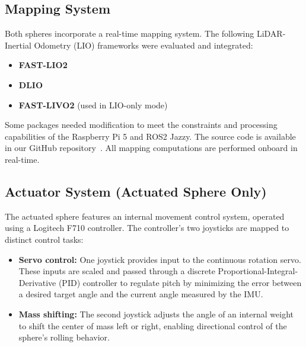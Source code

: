 \documentclass[conference]{IEEEtran}
\begin{document}
\subsection{Mapping System}

Both spheres incorporate a real-time mapping system. 
The following LiDAR-Inertial Odometry (LIO) frameworks were evaluated and integrated:

\begin{itemize}
    \item \textbf{FAST-LIO2}
    \item \textbf{DLIO}
    \item \textbf{FAST-LIVO2} (used in LIO-only mode)
\end{itemize}

Some packages needed modification to meet the constraints and processing capabilities of the Raspberry Pi 5 and ROS2 Jazzy.
The source code is available in our GitHub repository~\cite{githubsphere}.
All mapping computations are performed onboard in real-time.

\subsection{Actuator System (Actuated Sphere Only)}

The actuated sphere features an internal movement control system, operated using a  Logitech F710 controller. 
The controller's two joysticks are mapped to distinct control tasks:

\begin{itemize}
    \item \textbf{Servo control:} One joystick provides input to the continuous rotation servo. 
    These inputs are scaled and passed through a discrete Proportional-Integral-Derivative (PID) controller to regulate pitch by minimizing the error between a desired target angle and the current angle measured by the IMU.
    \item \textbf{Mass shifting:} The second joystick adjusts the angle of an internal weight to shift the center of mass left or right, enabling directional control of the sphere's rolling behavior.
\end{itemize}

\end{document}
